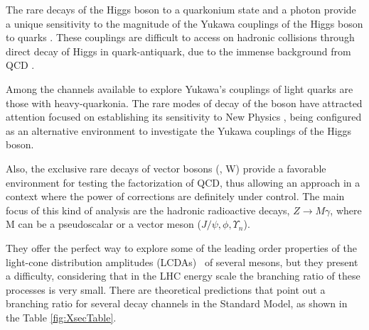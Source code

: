 The rare decays of the Higgs boson \cite{20121ATLAS,Chatrchyan:2012xdj} to a quarkonium state and a photon provide a unique sensitivity to the magnitude of the Yukawa couplings of the Higgs boson to quarks \cite{PhysRevD.88.053003, PhysRevD.90.113010,PhysRevLett.114.191803}. These couplings are difficult to access on hadronic collisions through direct decay of Higgs in quark-antiquark, due to the immense background from QCD \cite{PhysRevD.89.033014}. 

Among the channels available to explore Yukawa's couplings of light quarks \cite{PhysRevD.90.113010,PhysRevLett.114.191803} are those with heavy-quarkonia. The rare modes of decay of the \Z boson have attracted attention focused on establishing its sensitivity to New Physics \cite{PEREZ}, being configured as an alternative environment to investigate the Yukawa couplings of the Higgs boson.


Also, the exclusive rare decays of vector bosons (\Z, W) provide a favorable environment for testing the factorization of QCD, thus allowing an approach in a context where the power of corrections are definitely under control. The main focus of this kind of analysis are the hadronic radioactive decays, $Z\rightarrow M \gamma$, where M can be a pseudoscalar or a vector meson ($J/ \psi, \phi, \Upsilon_{n}$). 

They offer the perfect way to explore some of the leading order properties of the light-cone distribution amplitudes (LCDAs)~\cite{Grossman2015} of several mesons, but they present a difficulty, considering that in the LHC energy scale the branching ratio of these processes is very small. There are theoretical predictions \cite{PhysRevD.97.016009,PhysRevD.96.116014} that point out a branching ratio for several decay channels in the Standard Model, as shown in the Table \ref{fig:XsecTable}.


